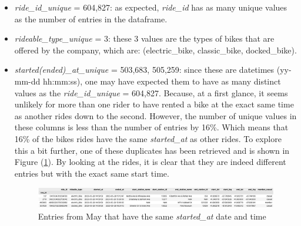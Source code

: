 \documentclass[12pt]{article}
\begin{document}
	\begin{itemize}
	\item \textit{ride\_id\_unique}  = 604,827: as expected, \textit{ride\_id} has as many unique values as the number of entries in the dataframe.
	\item \textit{rideable\_type\_unique} = 3: these 3 values are the types of bikes that are offered by the company, which are: \Big(electric\_bike, classic\_bike, docked\_bike\Big).
	\item \textit{started(ended)\_at\_unique} = 503,683,  505,259: since these are datetimes (yy-mm-dd hh:mm:ss), one may have expected them to have as many distinct values as the \textit{ride\_id\_unique} = 604,827. Because, at a first glance, it seems unlikely for more than one rider to have rented a bike at the exact same time as another rides down to the second. However, the number of unique values in these columns is less than the number of entries by 16\%. Which means that 16\% of the bikes rides have the same \textit{started\_at} as other rides. To explore this a bit further, one of these duplicates has been retrieved and is shown in Figure (\ref{fig10}). By looking at the rides, it is clear that they are indeed different entries but with the exact same start time. \\
	
	\begin{figure}[h]
	\hspace{-0.5in}
	\includegraphics[scale=0.46]{imgDups1.png}
	\caption{Entries from May that have the same \textit{started\_at} date and time}
	\label{fig10}
	\end{figure}
	

\end{itemize}
\end{document}
